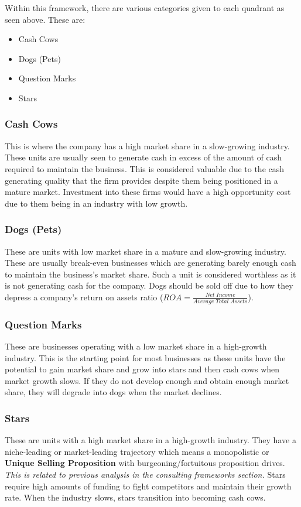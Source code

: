 \documentclass[a4paper]{article}
\begin{document}
{\vspace{5pt}
\noindent Within this framework, there are various categories given to each quadrant as seen above. These are:
\begin{itemize}
	\item Cash Cows
	\item Dogs (Pets)
	\item Question Marks
	\item Stars
\end{itemize}

\subsubsection{Cash Cows}
This is where the company has a high market share in a slow-growing industry. These units are usually seen to generate cash in excess of the amount of cash required to maintain the business. This is considered valuable due to the cash generating quality that the firm provides despite them being positioned in a mature market. Investment into these firms would have a high opportunity cost due to them being in an industry with low growth.

\subsubsection{Dogs (Pets)}
These are units with low market share in a mature and slow-growing industry. These are usually break-even businesses which are generating barely enough cash to maintain the business's market share. Such a unit is considered worthless as it is not generating cash for the company. Dogs should be sold off due to how they depress a company's return on assets ratio ($ROA = \frac{Net\; Income}{Average\; Total\; Assets}$).

\subsubsection{Question Marks}
These are businesses operating with a low market share in a high-growth industry. This is the starting point for most businesses as these units have the potential to gain market share and grow into stars and then cash cows when market growth slows. If they do not develop enough and obtain enough market share, they will degrade into dogs when the market declines.

\subsubsection{Stars}
These are units with a high market share in a high-growth industry. They have a niche-leading or market-leading trajectory which means a monopolistic or \textbf{Unique Selling Proposition} with burgeoning/fortuitous proposition drives. \textit{This is related to previous analysis in the consulting frameworks section.} Stars require high amounts of funding to fight competitors and maintain their growth rate. When the industry slows, stars transition into becoming cash cows.

}
\end{document}
